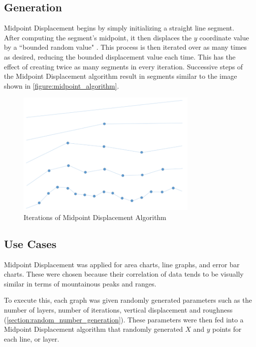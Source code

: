 \subsection{Generation}
Midpoint Displacement begins by simply initializing a straight line segment. After computing the segment's midpoint, it then displaces the \(y\) coordinate value by a ``bounded random value" \cite{acin_2016}. This process is then iterated over as many times as desired, reducing the bounded displacement value each time. This has the effect of creating twice as many segments in every iteration. Successive steps of the Midpoint Displacement algorithm result in segments similar to the image shown in \autoref{figure:midpoint_algorithm}.

\hfill

\begin{figure}[hbt]
    \centering
    \includegraphics[width=250pt,keepaspectratio]{figures/body/methodology/MD_line_segments.PNG}
    \caption{Iterations of Midpoint Displacement Algorithm \cite{acin_2016}}
    \label{figure:midpoint_algorithm}
\end{figure}

\subsection{Use Cases}
Midpoint Displacement was applied for area charts, line graphs, and error bar charts. These were chosen because their correlation of data tends to be visually similar in terms of mountainous peaks and ranges.

\hfill

To execute this, each graph was given randomly generated parameters such as the number of layers, number of iterations, vertical displacement and roughness (\autoref{section:random_number_generation}). These parameters were then fed into a Midpoint Displacement algorithm that randomly generated \(X\) and \(y\) points for each line, or layer. 

